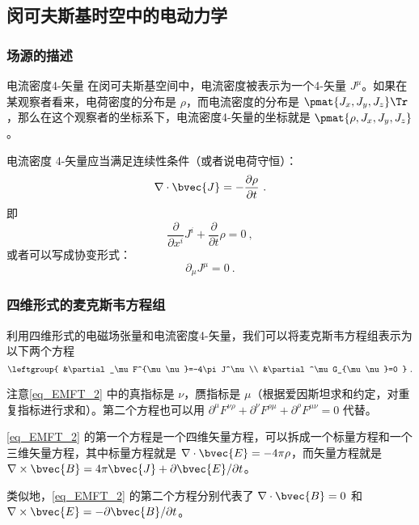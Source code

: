 \subsection{闵可夫斯基时空中的电动力学}

\subsubsection{场源的描述}

\begin{definition}{电流密度4-矢量}
在闵可夫斯基空间中，电流密度被表示为一个4-矢量 $J^\mu$。如果在某观察者看来，电荷密度的分布是 $\rho$，而电流密度的分布是 $\pmat{J_x, J_y, J_z}\Tr$，那么在这个观察者的坐标系下，电流密度4-矢量的坐标就是 $\pmat{\rho, J_x, J_y, J_z}$。
\end{definition}

电流密度 4-矢量应当满足连续性条件（或者说电荷守恒）：
\begin{equation}
\nabla\cdot\bvec{J}=-\frac{\partial\rho}{\partial t}~.
\end{equation}
即
\begin{equation}
\frac{\partial}{\partial x^i}J^i+\frac{\partial}{\partial t}\rho=0~,
\end{equation}
或者可以写成协变形式：
\begin{equation}
\partial_\mu J^\mu=0~.
\end{equation}
\subsubsection{四维形式的麦克斯韦方程组}

利用四维形式的电磁场张量和电流密度4-矢量，我们可以将麦克斯韦方程组表示为以下两个方程
\begin{equation}\label{eq_EMFT_2}
\leftgroup{
    &\partial_\mu F^{\mu\nu}=-4\pi J^\nu\\
    &\partial^\mu G_{\mu\nu}=0
}~.
\end{equation}

注意\autoref{eq_EMFT_2} 中的真指标是 $\nu$，赝指标是 $\mu$（根据爱因斯坦求和约定，对重复指标进行求和）。第二个方程也可以用 $\partial^\mu F^{\nu\rho}+\partial^\nu F^{\rho\mu}+\partial^\rho F^{\mu\nu}=0$ 代替。

\autoref{eq_EMFT_2} 的第一个方程是一个四维矢量方程，可以拆成一个标量方程和一个三维矢量方程，其中标量方程就是 $\nabla\cdot\bvec{E}=-4\pi \rho$，而矢量方程就是 $\nabla\times\bvec{B}=4\pi \bvec{J}+\partial\bvec{E}/\partial t$。 

类似地，\autoref{eq_EMFT_2} 的第二个方程分别代表了 $\nabla\cdot\bvec{B}=0$ 和 $\nabla\times\bvec{E}=-\partial\bvec{B}/\partial t$。

